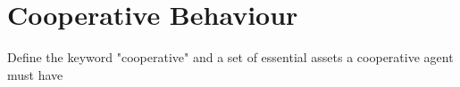 \chapter{Cooperative Behaviour}
Define the keyword "cooperative" and a set of essential assets a cooperative agent must have

